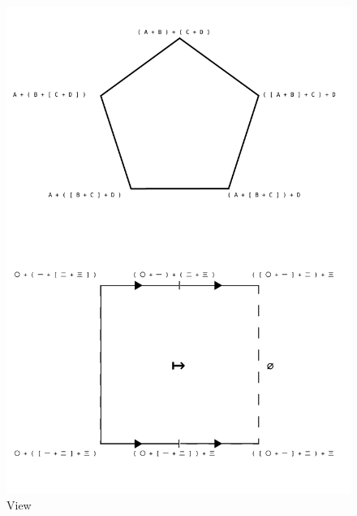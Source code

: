 \documentclass{llncs}
\begin{document}
\begin{figure}\centering \includegraphics[scale=0.5]{maclaneSolution.svg.pdf} \caption{View}\end{figure}
\end{document}
